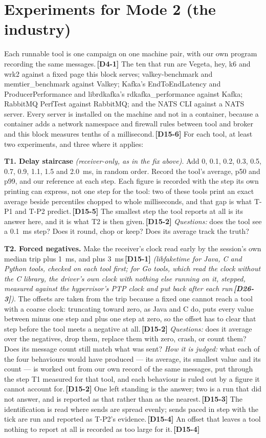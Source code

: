 \documentclass[11pt]{article}
\newcommand{\gl}[1]{{\color{soft}\itshape\small (#1)}}
\newcommand{\chgold}[1]{\,{\color{oldcol}\bfseries\footnotesize[#1]}}
\begin{document}
\section{Experiments for Mode 2 (the industry)}

Each runnable tool is one campaign on one machine pair, with our own program recording the same messages.\chgold{D4-1} The ten that run are Vegeta, hey, k6 and wrk2 against a fixed page this block serves; valkey-benchmark and memtier\_benchmark against Valkey; Kafka's EndToEndLatency and ProducerPerformance and librdkafka's rdkafka\_performance against Kafka; RabbitMQ PerfTest against RabbitMQ; and the NATS CLI against a NATS server. Every server is installed on the machine and not in a container, because a container adds a network namespace and firewall rules between tool and broker and this block measures tenths of a millisecond.\chgold{D15-6} For each tool, at least two experiments, and three where it applies:

\textbf{T1. Delay staircase} \gl{receiver-only, as in the fix above}. Add 0, 0.1, 0.2, 0.3, 0.5, 0.7, 0.9, 1.1, 1.5 and 2.0~ms, in random order. Record the tool's average, p50 and p99, and our reference at each step. Each figure is recorded with the step its own printing can express, not one step for the tool: two of these tools print an exact average beside percentiles chopped to whole milliseconds, and that gap is what T-P1 and T-P2 predict.\chgold{D15-5} The smallest step the tool reports at all is its answer here, and it is what T2 is then given.\chgold{D15-2} \emph{Questions:} does the tool see a 0.1~ms step? Does it round, chop or keep? Does its average track the truth?

\textbf{T2. Forced negatives.} Make the receiver's clock read early by the session's own median trip plus 1~ms, and plus 3~ms\chgold{D15-1} \gl{libfaketime for Java, C and Python tools, checked on each tool first; for Go tools, which read the clock without the C library, the driver's own clock with nothing else running on it, stepped, measured against the hypervisor's PTP clock and put back after each run\chgold{D26-3}}. The offsets are taken from the trip because a fixed one cannot reach a tool with a coarse clock: truncating toward zero, as Java and C do, puts every value between minus one step and plus one step at zero, so the offset has to clear that step before the tool meets a negative at all.\chgold{D15-2} \emph{Questions:} does it average over the negatives, drop them, replace them with zero, crash, or count them? Does its message count still match what was sent? \emph{How it is judged:} what each of the four behaviours would have produced --- its average, its smallest value and its count --- is worked out from our own record of the same messages, put through the step T1 measured for that tool, and each behaviour is ruled out by a figure it cannot account for.\chgold{D15-2} One left standing is the answer; two is a run that did not answer, and is reported as that rather than as the nearest.\chgold{D15-3} The identification is read where sends are spread evenly; sends paced in step with the tick are run and reported as T-P2's evidence.\chgold{D15-4} An offset that leaves a tool nothing to report at all is recorded as too large for it.\chgold{D15-4}
\end{document}
